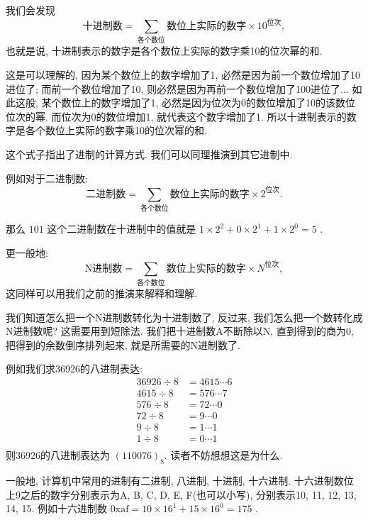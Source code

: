         我们会发现
            \[ \mbox{十进制数} = \sum _ {\mbox{各个数位}} \mbox{数位上实际的数字} \times 10 ^ {\mbox{位次}}, \]
        也就是说, 十进制表示的数字是各个数位上实际的数字乘10的位次幂的和. 
        
        这是可以理解的, 因为某个数位上的数字增加了1, 必然是因为前一个数位增加了10进位了; 而前一个数位增加了10, 则必然是因为再前一个数位增加了100进位了... 如此这般, 某个数位上的数字增加了1, 必然是因为位次为0的数位增加了10的该数位位次的幂. 而位次为0的数位增加1, 就代表这个数字增加了1. 所以十进制表示的数字是各个数位上实际的数字乘10的位次幂的和.

        这个式子指出了进制的计算方式. 我们可以同理推演到其它进制中.

        例如对于二进制数:
            \[ \mbox{二进制数} = \sum _ {\mbox{各个数位}} \mbox{数位上实际的数字} \times 2 ^ {\mbox{位次}}. \]

        那么 $ 101 $ 这个二进制数在十进制中的值就是 $ 1 \times 2 ^ 2 + 0 \times 2 ^ 1 + 1 \times 2 ^ 0 = 5 $ .

        更一般地:
            \begin{equation*}
                \mbox{N进制数} = \sum _ {\mbox{各个数位}} \mbox{数位上实际的数字} \times N ^ {\mbox{位次}}, \label{进制转换公式}
            \end{equation*}
        这同样可以用我们之前的推演来解释和理解.

        我们知道怎么把一个N进制数转化为十进制数了, 反过来, 我们怎么把一个数转化成N进制数呢? 这需要用到短除法. 我们把十进制数A不断除以N, 直到得到的商为0, 把得到的余数倒序排列起来, 就是所需要的N进制数了.

        例如我们求36926的八进制表达:
        \begin{align*}
            36926 \div 8 &= 4615 \cdots 6 \\
            4615 \div 8 &= 576 \cdots 7 \\
            576 \div 8 &= 72 \cdots 0 \\
            72 \div 8 &= 9 \cdots 0 \\
            9 \div 8 &= 1 \cdots 1 \\
            1 \div 8 &= 0 \cdots 1 \\
        \end{align*}
        则36926的八进制表达为 $ (110076)_8 $. 读者不妨想想这是为什么.

        一般地, 计算机中常用的进制有二进制, 八进制, 十进制, 十六进制. 十六进制数位上9之后的数字分别表示为A, B, C, D, E, F(也可以小写), 分别表示10, 11, 12, 13, 14, 15. 例如十六进制数 $ \textrm{0xaf} = 10 \times 16 ^ 1 + 15 \times 16 ^ 0 = 175 $ . 

